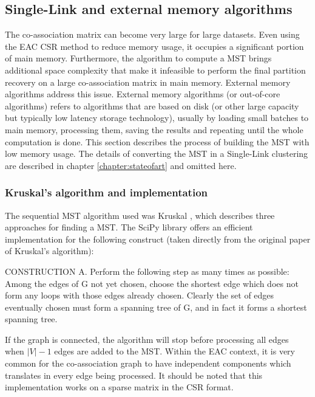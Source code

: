 \subsection{Single-Link and external memory algorithms}
\label{sec:sl disk}


The co-association matrix can become very large for large datasets.
Even using the EAC CSR method to reduce memory usage, it occupies a significant portion of main memory.
Furthermore, the algorithm to compute a MST brings additional space complexity that make it infeasible to perform the final partition recovery on a large co-association matrix in main memory.
External memory algorithms address this issue.
External memory algorithms (or out-of-core algorithms) refers to algorithms that are based on disk (or other large capacity but typically low latency storage technology), usually by loading small batches to main memory, processing them, saving the results and repeating until the whole computation is done.
This section describes the process of building the MST with low memory usage.
The details of converting the MST in a Single-Link clustering are described in chapter \ref{chapter:stateofart} and omitted here.

\subsubsection{Kruskal's algorithm and implementation}

The sequential MST algorithm used was Kruskal \cite{kruskal1956shortest}, which describes three approaches for finding a MST.
The SciPy library offers an efficient implementation for the following construct (taken directly from the original paper of Kruskal's algorithm):
\begin{displayquote}
CONSTRUCTION A. Perform the following step as many times as possible: Among the edges of G not yet chosen, choose the shortest edge which does not form any loops with those edges already chosen. Clearly the set of edges eventually chosen must form a spanning tree of G, and in fact it forms a shortest spanning tree.
\end{displayquote}
If the graph is connected, the algorithm will stop before processing all edges when $|V| - 1$ edges are added to the MST.
Within the EAC context, it is very common for the co-association graph to have independent components which translates in every edge being processed.
It should be noted that this implementation works on a sparse matrix in the CSR format.


